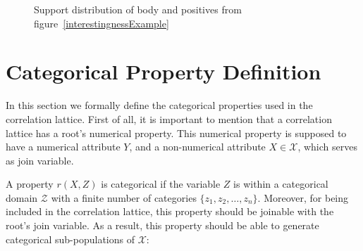 \begin{figure}[h!]
\begin{center}
  \caption{Support distribution of body and positives from figure~\ref{interestingnessExample}}
\label{interestingnessDistribution}
\end{center}
\end{figure}

\section{Categorical Property Definition}
\label{sec:categorical-properties}

In this section we formally define the categorical properties used in the correlation lattice. First of all, it is
important to mention that a correlation lattice has a root's numerical property. This numerical property is supposed to
have a numerical attribute $Y$, and a non-numerical attribute $X \in \mathcal{X}$, which serves as join variable.

A property $r(X,Z)$ is categorical if the variable $Z$ is within a categorical domain $\mathcal{Z}$ with a finite
number of categories $\{z_1,z_2,\ldots,z_n\}$. Moreover, for being included in the correlation lattice, this
property should be joinable with the root's join variable. As a result, this property should be able to generate
categorical sub-populations of $\mathcal{X}$:

